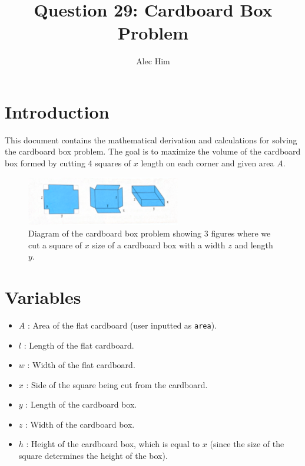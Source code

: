 \documentclass{article}
\title{Question 29: Cardboard Box Problem}
\author{Alec Him}
\date{}
\begin{document}
\maketitle


\section{Introduction}
This document contains the mathematical derivation and calculations for solving the cardboard box problem. The goal is to maximize the volume of the cardboard box formed by cutting 4 squares of \( x\) length on each corner and given area \( A \).
\begin{figure}[h!]
    \centering
    \includegraphics[width=0.6\textwidth]{Figure1.pdf}
    \caption{Diagram of the cardboard box problem showing 3 figures where we cut a square of \( x \) size of a cardboard box with a width \(z \) and length \( y \).}
    \label{fig.Graph}
\end{figure}

\section{Variables}
\begin{itemize}
    \item \( A \) : Area of the flat cardboard (user inputted as \texttt{area}).
    \item \( l \) : Length of the flat cardboard.
    \item \( w \) : Width of the flat cardboard.
    \item \( x \) : Side of the square being cut from the cardboard.
    \item \( y \) : Length of the cardboard box.
    \item \( z \) : Width of the cardboard box.
    \item \( h \) : Height of the cardboard box, which is equal to \( x \) (since the size of the square determines the height of the box).
\end{itemize}
\end{document}
